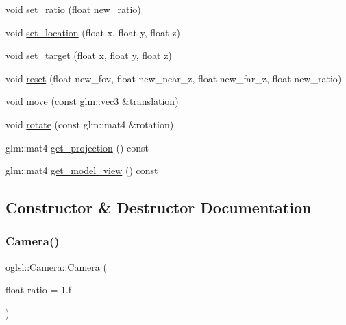 \begin{DoxyCompactItemize}
\item 
void \mbox{\hyperlink{classoglsl_1_1_camera_ad6589c31c3af3b8b503404dcc77340da}{set\+\_\+ratio}} (float new\+\_\+ratio)
\item 
void \mbox{\hyperlink{classoglsl_1_1_camera_aa1b54984fcded5741edb6567de591568}{set\+\_\+location}} (float x, float y, float z)
\item 
void \mbox{\hyperlink{classoglsl_1_1_camera_aacc8dff16915674550dc6d6455565c1f}{set\+\_\+target}} (float x, float y, float z)
\item 
void \mbox{\hyperlink{classoglsl_1_1_camera_a1ed2ab7da65d3c57b6a77a64c3a0a721}{reset}} (float new\+\_\+fov, float new\+\_\+near\+\_\+z, float new\+\_\+far\+\_\+z, float new\+\_\+ratio)
\item 
void \mbox{\hyperlink{classoglsl_1_1_camera_af53ebc56e9465ce12f559c02ecd453a8}{move}} (const glm\+::vec3 \&translation)
\item 
void \mbox{\hyperlink{classoglsl_1_1_camera_a296e47acedb22dac6fb01fbac5263dc0}{rotate}} (const glm\+::mat4 \&rotation)
\item 
glm\+::mat4 \mbox{\hyperlink{classoglsl_1_1_camera_a8f2bb51e63f0aaa923f72090f6ef161e}{get\+\_\+projection}} () const
\item 
glm\+::mat4 \mbox{\hyperlink{classoglsl_1_1_camera_a79ae892a62f2a1d12d3c49a43de214ed}{get\+\_\+model\+\_\+view}} () const
\end{DoxyCompactItemize}


\subsection{Constructor \& Destructor Documentation}
\mbox{\label{classoglsl_1_1_camera_abb13e0c73a2478c0eb88466438a705ac}} 
\subsubsection{\texorpdfstring{Camera()}{Camera()}\hspace{0.1cm}{\footnotesize\ttfamily [1/3]}}
{\footnotesize\ttfamily oglsl\+::\+Camera\+::\+Camera (\begin{DoxyParamCaption}\item[{float}]{ratio = {\ttfamily 1.f} }\end{DoxyParamCaption})\hspace{0.3cm}{\ttfamily [inline]}}

